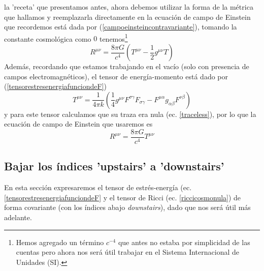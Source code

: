  la 'receta' que presentamos antes, ahora debemos utilizar la forma de la métrica que hallamos y reemplazarla directamente en la ecuación de campo de Einstein que recordemos está dada por (\ref{campoeinsteincontravariante}), tomando la constante cosmológica como $0$ tenemos\footnote{Hemos agregado un término $c^{-4}$ que antes no estaba por simplicidad de las cuentas pero ahora nos será útil trabajar en el Sistema Internacional de Unidades (SI).}
\begin{equation*}
R^{\mu\nu}= \frac{8 \pi G}{c^4}\left(T^{\mu\nu}-\frac{1}{2} g^{\mu\nu} T\right)
\end{equation*}
Además, recordando que estamos trabajando en el vacío (solo con presencia de campos electromagnéticos), el tensor de energía-momento está dado por (\ref{tensorestresenergiafunciondeF})
\begin{equation*}
T^{\mu\nu}=\frac{1}{4\pi k}\left(\frac{1}{4}g^{\mu\nu}F^{\sigma\gamma}F_{\sigma\gamma}-F^{\mu\alpha}g_{\alpha\beta}F^{\nu\beta}\right)
\end{equation*}
y para este tensor calculamos que su traza era nula (ec. \ref{traceless}), por lo que la ecuación de campo de Einstein que usaremos es
\begin{equation}
R^{\mu\nu}=\frac{8 \pi G}{c^4}T^{\mu\nu}
\label{riccicosmonula}
\end{equation}
\subsection*{\textbf{Bajar los índices 'upstairs' a 'downstairs'}}

En esta sección expresaremos el tensor de estrés-energía (ec. \ref{tensorestresenergiafunciondeF} y el tensor de Ricci (ec. \ref{riccicosmonula}) de forma covariante (con los índices abajo \textit{downstairs}), dado que nos será útil más adelante. 


